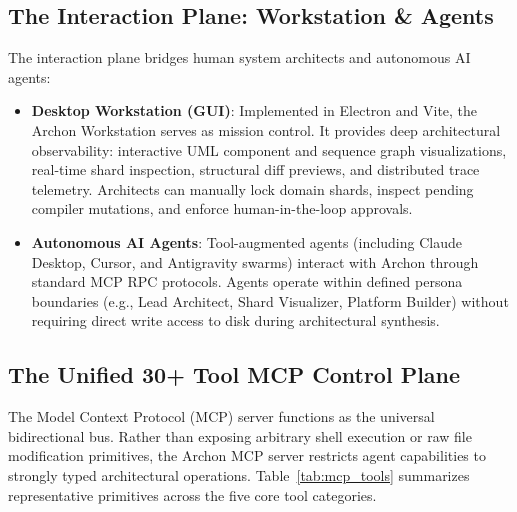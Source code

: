 \subsection{The Interaction Plane: Workstation \& Agents}
The interaction plane bridges human system architects and autonomous AI agents:
\begin{itemize}[leftmargin=*]
  \item \textbf{Desktop Workstation (GUI)}: Implemented in Electron and Vite, the Archon Workstation serves as mission control. It provides deep architectural observability: interactive UML component and sequence graph visualizations, real-time shard inspection, structural diff previews, and distributed trace telemetry. Architects can manually lock domain shards, inspect pending compiler mutations, and enforce human-in-the-loop approvals.
  \item \textbf{Autonomous AI Agents}: Tool-augmented agents (including Claude Desktop, Cursor, and Antigravity swarms) interact with Archon through standard MCP RPC protocols. Agents operate within defined persona boundaries (e.g., Lead Architect, Shard Visualizer, Platform Builder) without requiring direct write access to disk during architectural synthesis.
\end{itemize}

\subsection{The Unified 30+ Tool MCP Control Plane}
The Model Context Protocol (MCP) server functions as the universal bidirectional bus. Rather than exposing arbitrary shell execution or raw file modification primitives, the Archon MCP server restricts agent capabilities to strongly typed architectural operations. Table~\ref{tab:mcp_tools} summarizes representative primitives across the five core tool categories.

